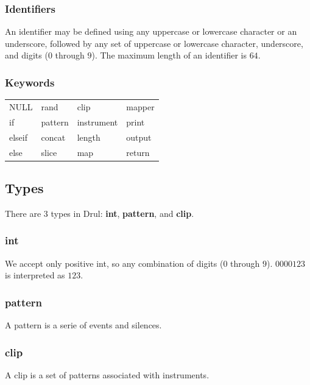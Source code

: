\documentclass[11pt,twoside]{article}
\begin{document}
\subsubsection{Identifiers}
An identifier may be defined using any uppercase or lowercase character
or an underscore, followed by any set of uppercase or lowercase character,
underscore, and digits ($0$ through $9$). The maximum length of an identifier
is $64$.

\subsubsection{Keywords}


\begin{table}[htb]
\begin{center} 
\begin{tabular}{llll} 
  NULL &    rand &    clip &        mapper \\
  if &      pattern & instrument &  print \\
  elseif &  concat &  length &      output \\
  else &    slice &   map &         return
\end{tabular}
\label{tab:keywords}
\end{center} 
\end{table}



\subsection{Types}

There are $3$ types in Drul: \textbf{int}, \textbf{pattern},
and \textbf{clip}.

\subsubsection{int}
We accept only positive int, so any combination of digits
($0$ through $9$). $0000123$ is interpreted as $123$.

\subsubsection{pattern}
A pattern is a serie of events and silences.


\subsubsection{clip}
A clip is a set of patterns associated with instruments.
\end{document}
